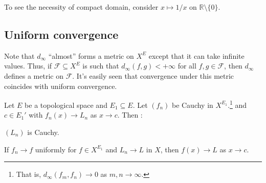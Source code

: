 	\begin{rmk}
		To see the necessity of compact domain, consider $x\mapsto 1/x$ on $\mathbb R\setminus\{0\}$.
	\end{rmk}
	
	
	
	
\subsection{Uniform convergence}

	Note that $d_\infty$ ``almost'' forms a metric on $X^E$ except that it can take infinite values. Thus, if $\mathscr F\subseteq X^E$ is such that $d_\infty(f, g) < +\infty$ for all $f, g\in \mathscr F$, then $d_\infty$ defines a metric on $\mathscr F$. It's easily seen that convergence under this metric coincides with uniform convergence.
	
	
	\begin{prp}
		Let $E$ be a topological space and $E_1\subseteq E$. Let $(f_n)$ be Cauchy in $X^{E_1}$.\footnote{
			That is, $d_\infty(f_m, f_n)\to 0$ as $m, n\to\infty$.
		} and $c\in E_1'$ with $f_n(x)\to L_n$ as $x\to c$. Then \tfh:
		\begin{mylist}
			\item $(L_n)$ is Cauchy.
			
			\item If $f_n\to f$ uniformly for $f\in X^{E_1}$ and $L_n\to L$ in $X$, then $f(x)\to L$ as $x\to c$.
		\end{mylist}
	\end{prp}
	
